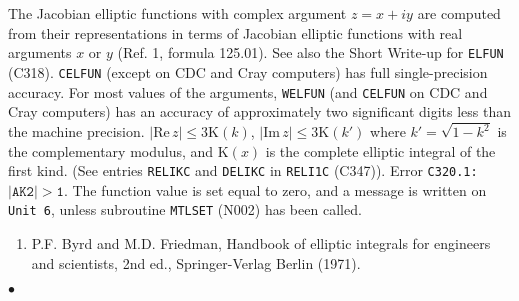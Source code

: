 \Method
The Jacobian elliptic functions with complex argument $z=x+iy$
are computed from their re\-presentations in terms of Jacobian elliptic
functions with real arguments $x$ or $y$ (Ref. 1, formula 125.01).
See also the Short Write-up for {\tt ELFUN} (C318).
\newpage
\Accuracy
{\tt CELFUN} (except on CDC and Cray computers)
has full single-precision accuracy.
For most values of the arguments, {\tt WELFUN}
(and {\tt CELFUN} on CDC and Cray computers) has an accuracy of
approximately two significant digits less than the machine precision.
\Restrict
$|\mathrm{Re}\,z| \le 3 \mathrm{K}(k)$,
$|\mathrm{Im}\,z| \le 3 \mathrm{K}(k')$
where $k'=\sqrt{1-k^2}$ is the complementary modulus, and
$\mathrm{K}(x)$ is the complete elliptic integral of the first kind.
(See entries
{\tt RELIKC} and {\tt DELIKC} in {\tt RELI1C} (C347)).
\Errorh
Error {\tt C320.1:} $\mathtt{|AK2| > 1}$. The function value
is set equal to zero, and a message is written on {\tt Unit 6},
unless subroutine {\tt MTLSET} (N002) has been called.
\Refer
\begin{enumerate}
\item P.F. Byrd and M.D. Friedman, Handbook of elliptic integrals for
engineers and scientists, 2nd ed., Springer-Verlag Berlin (1971).
\end{enumerate}
$\bullet$

